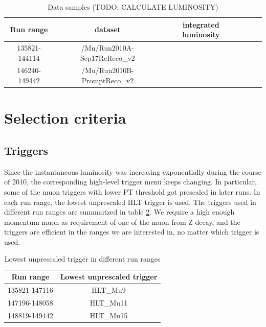 \documentclass{cmspaper}
\begin{document}
\begin{table}[htbp]
   \caption{Data samples (TODO: CALCULATE LUMINOSITY)}
   \centering
   \begin{tabular}{|c|c|c|c|c|c|}
   \hline
   Run range & dataset & integrated luminosity \\\hline
   135821-144114 & /Mu/Run2010A-Sep17ReReco\_v2 &  \\\hline
   146240-149442 & /Mu/Run2010B-PromptReco\_v2 &  \\\hline
   \end{tabular}
   \label{Table_DataSamples}
\end{table}


\section{Selection criteria}


\subsection{Triggers}

Since the instantaneous luminosity was increasing exponentially during the course of 2010, the corresponding high-level trigger menu keeps changing.
In particular, some of the muon triggers with lower PT threshold got prescaled in later runs.
In each run range, the lowest unprescaled HLT trigger is used.  The triggers used in different run ranges are summarized in table \ref{Table_TriggerUsed}.
We require a high enough momentum muon as requirement of one of the muon from Z decay, and the triggers are efficient in the ranges we are interested in,
no matter which trigger is used.

\begin{table}[htbp]
   \caption{Lowest unprescaled trigger in different run ranges}
   \centering
   \begin{tabular}{|c|c|}
   \hline
   Run range & Lowest unprescaled trigger \\\hline
   135821-147116 & HLT\_Mu9 \\\hline
   147196-148058 & HLT\_Mu11 \\\hline
   148819-149442 & HLT\_Mu15 \\\hline
   \end{tabular}
   \label{Table_TriggerUsed}
\end{table}
\end{document}
